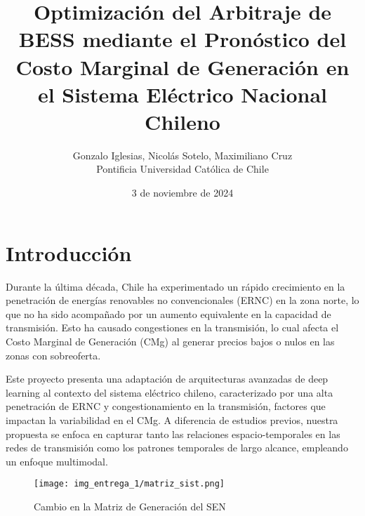 \documentclass[11pt, twocolumn]{article}
\title{\vspace{-1cm}Optimización del Arbitraje de BESS mediante el Pronóstico del Costo Marginal de Generación en el Sistema Eléctrico Nacional Chileno}
\author{
    \begin{tabular}[t]{c} 
        Gonzalo Iglesias, Nicolás Sotelo, Maximiliano Cruz \\
        Pontificia Universidad Católica de Chile \\
    \end{tabular}
}
\date{3 de noviembre de 2024}
\begin{document}

\section{Introducción}
\vspace{-1em} 
Durante la última década, Chile ha experimentado un rápido crecimiento en la penetración de energías renovables no convencionales (ERNC) en la zona norte, lo que no ha sido acompañado por un aumento equivalente en la capacidad de transmisión. Esto ha causado congestiones en la transmisión, lo cual afecta el Costo Marginal de Generación (CMg) al generar precios bajos o nulos en las zonas con sobreoferta.

Este proyecto presenta una adaptación de arquitecturas avanzadas de deep learning al contexto del sistema eléctrico chileno, caracterizado por una alta penetración de ERNC y congestionamiento en la transmisión, factores que impactan la variabilidad en el CMg. A diferencia de estudios previos, nuestra propuesta se enfoca en capturar tanto las relaciones espacio-temporales en las redes de transmisión como los patrones temporales de largo alcance, empleando un enfoque multimodal.

\begin{figure}[!b]
    \centering
    \texttt{[image: img\_entrega\_1/matriz\_sist.png]}
    \caption{Cambio en la Matriz de Generación del SEN}
    \label{fig:matriz_sistema}
\end{figure}
\end{document}
